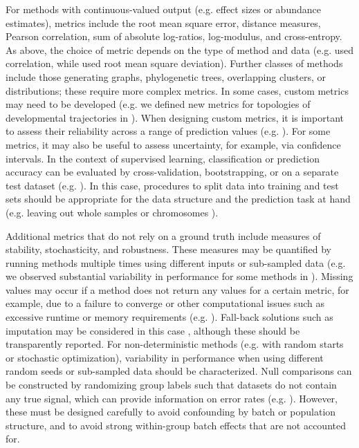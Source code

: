 For methods with continuous-valued output (e.g. effect sizes or abundance estimates), metrics include the root mean square error, distance measures, Pearson correlation, sum of absolute log-ratios, log-modulus, and cross-entropy. As above, the choice of metric depends on the type of method and data (e.g. \cite{costello_communityeffortassess_2014,lindgreen_evaluationaccuracyspeed_2016}  used correlation, while \cite{moult_criticalassessmentmethods_2016} used root mean square deviation). Further classes of methods include those generating graphs, phylogenetic trees, overlapping clusters, or distributions; these require more complex metrics. In some cases, custom metrics may need to be developed (e.g. we defined new metrics for topologies of developmental trajectories in \cite{saelens_comparisonsinglecelltrajectory_2019}). When designing custom metrics, it is important to assess their reliability across a range of prediction values (e.g. \cite{gurevich_quastqualityassessment_2013,narzisi_comparingnovogenome_2011}). For some metrics, it may also be useful to assess uncertainty, for example, via confidence intervals. In the context of supervised learning, classification or prediction accuracy can be evaluated by cross-validation, bootstrapping, or on a separate test dataset (e.g. \cite{gardner_identifyingaccuratemetagenome_2019,aghaeepour_benchmarkevaluationalgorithms_2016}). In this case, procedures to split data into training and test sets should be appropriate for the data structure and the prediction task at hand (e.g. leaving out whole samples or chromosomes \cite{schreiber_pitfallmachinelearning_2019}).

Additional metrics that do not rely on a ground truth include measures of stability, stochasticity, and robustness. These measures may be quantified by running methods multiple times using different inputs or sub-sampled data (e.g. we observed substantial variability in performance for some methods in \cite{soneson_biasrobustnessscalability_2018,weber_comparisonclusteringmethods_2016}). Missing values may occur if a method does not return any values for a certain metric, for example, due to a failure to converge or other computational issues such as excessive runtime or memory requirements (e.g. \cite{saelens_comparisonsinglecelltrajectory_2019, soneson_biasrobustnessscalability_2018,weber_comparisonclusteringmethods_2016}). Fall-back solutions such as imputation may be considered in this case \cite{bischl_benchmarkinglocalclassification_2013}, although these should be transparently reported. For non-deterministic methods (e.g. with random starts or stochastic optimization), variability in performance when using different random seeds or sub-sampled data should be characterized. Null comparisons can be constructed by randomizing group labels such that datasets do not contain any true signal, which can provide information on error rates (e.g. \cite{weber_diffcytdifferentialdiscovery_2019,zhou_robustlydetectingdifferential_2014,law_voomprecisionweights_2014}). However, these must be designed carefully to avoid confounding by batch or population structure, and to avoid strong within-group batch effects that are not accounted for.


